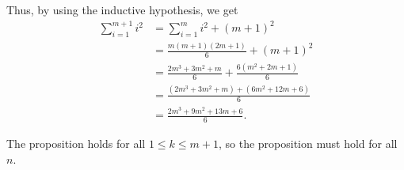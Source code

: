 \documentclass[12pt]{article}
\newenvironment{problem}[2][Problem]{\begin{trivlist}
\item[\hskip \labelsep {\bfseries #1}\hskip \labelsep {\bfseries #2.}]}{\end{trivlist}}
\begin{document}
\begin{problem}{5}
\noindent
Thus, by using the inductive hypothesis, we get
\begin{align*}
\sum\limits_{i=1}^{m+1} i^2 & = \sum\limits_{i=1}^{m} i^2 + (m+1)^2 \\
& = \frac{m(m+1)(2m+1)}{6} + (m+1)^2 \\
& = \frac{2m^3+3m^2+m}{6} + \frac{6(m^2+2m+1)}{6} \\
& = \frac{(2m^3+3m^2+m)+(6m^2+12m+6)}{6} \\
& =\frac{2m^3+9m^2+13m+6}{6}.
\end{align*}

\noindent
The proposition holds for all $1 \leq k \leq m+1$, so the proposition must hold for all $n$. \qedsymbol

\end{problem}

\end{document}

